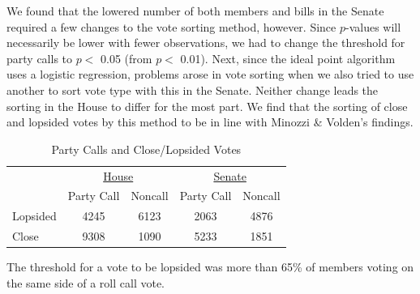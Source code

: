\documentclass[12pt]{article}
\newcommand\fnote[1]{\captionsetup{font=normalsize}\caption*{#1}}
\begin{document}
We found that the lowered number of both members and bills in the Senate required a few changes to the vote sorting method, however. Since $p$-values will necessarily be lower with fewer observations, we had to change the threshold for party calls to $p <$ 0.05 (from $p <$ 0.01). Next, since the ideal point algorithm uses a logistic regression, problems arose in vote sorting when we also tried to use another to sort vote type with this in the Senate. Neither change leads the sorting in the House to differ for the most part. We find that the sorting of close and lopsided votes by this method to be in line with Minozzi \& Volden's findings.

\begin{table}[H]
\centering
\begin{threeparttable}
\label{tab-close-lop}
\singlespacing
\caption{Party Calls and Close/Lopsided Votes}
\begin{tabular}{l cc cc}
\hline
&\multicolumn{2}{c}{\underline{House}}&\multicolumn{2}{c}{\underline{Senate}}\\
& Party Call & Noncall& Party Call & Noncall \\
\hline
Lopsided & 4245 & 6123 & 2063 & 4876  \\
Close & 9308 & 1090 & 5233 & 1851 \\
\hline
\end{tabular}
\begin{tablenotes}
   \item
   The threshold for a vote to be lopsided was more than 65\% of members voting on the same side of a roll call vote.
 \end{tablenotes}
\end{threeparttable}
\end{table}

%
\end{document}
